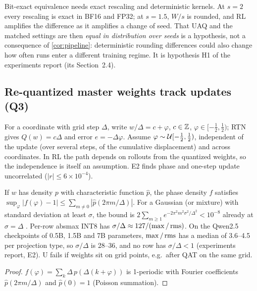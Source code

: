 \documentclass[11pt]{article}
\begin{document}
\begin{remark}\label{rem:practice}
Bit-exact equivalence needs exact rescaling and deterministic kernels. At $s=2$ every rescaling is exact in BF16 and FP32; at $s=1.5$, $W/s$ is rounded, and RL amplifies the difference as it amplifies a change of seed. That UAQ and the matched settings are then \emph{equal in distribution over seeds} is a hypothesis, not a consequence of \cref{cor:pipeline}: deterministic rounding differences could also change how often runs enter a different training regime. It is hypothesis H1 of the experiments report (its Section~2.4).
\end{remark}

\subsection{Re-quantized master weights track updates (Q3)}\label{sec:tracking}

\begin{assumptionU}
For a coordinate with grid step $\Delta$, write $w/\Delta=c+\varphi$, $c\in\mathbb{Z}$, $\varphi\in[-\tfrac12,\tfrac12)$; RTN gives $Q(w)=c\Delta$ and error $e=-\Delta\varphi$. Assume $\varphi\sim\mathcal{U}[-\tfrac12,\tfrac12)$, independent of the update (over several steps, of the cumulative displacement) and across coordinates. In RL the path depends on rollouts from the quantized weights, so the independence is itself an assumption. E2 finds phase and one-step update uncorrelated ($|r|\le6\times10^{-4}$).
\end{assumptionU}

\begin{lemma}\label{lem:phase}
If $w$ has density $p$ with characteristic function $\hat p$, the phase density $f$ satisfies $\sup_\varphi|f(\varphi)-1|\le\sum_{m\ne0}|\hat p(2\pi m/\Delta)|$. For a Gaussian (or mixture) with standard deviation at least $\sigma$, the bound is $2\sum_{m\ge1}e^{-2\pi^2m^2\sigma^2/\Delta^2}<10^{-8}$ already at $\sigma=\Delta$ \citep{widrow2008quantization,sripad1977necessary}. Per-row absmax INT8 has $\sigma/\Delta\approx127/(\max/\operatorname{rms})$. On the Qwen2.5 checkpoints of 0.5B, 1.5B and 7B parameters, $\max/\operatorname{rms}$ has a median of 3.6--4.5 per projection type, so $\sigma/\Delta$ is 28--36, and no row has $\sigma/\Delta<1$ (experiments report, E2). U fails if weights sit on grid points, e.g.\ after QAT on the same grid.
\end{lemma}
\begin{proof}
$f(\varphi)=\sum_k\Delta\,p(\Delta(k+\varphi))$ is 1-periodic with Fourier coefficients $\hat p(2\pi m/\Delta)$ and $\hat p(0)=1$ (Poisson summation).
\end{proof}
\end{document}
